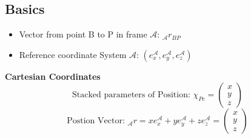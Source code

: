 \documentclass[fontsize=6pt,DIV=calc,a4paper,ngerman]{scrartcl}
\begin{document}
\begin{multicols*}{4}


	\section{Basics}
	\begin{itemize}
		\item[] Vector from point B to P in frame $\mathcal{A}$: \quad $ {}_\mathcal{A} r_{BP}$
		\item[] Reference coordinate System $\mathcal{A}$: \quad $(e^{\mathcal{A}}_x,e^{\mathcal{A}}_y,e^{\mathcal{A}}_z)$
	\end{itemize}
	\textbf{Cartesian Coordinates}
	$$\text{Stacked parameters of Position:  }\chi_{Pc}=\begin{pmatrix}x\\y\\z\end{pmatrix}$$
	$$\text{Postion Vector: } {}_\mathcal{A}r = xe^{\mathcal{A}}_x+ye^{\mathcal{A}}_y+ze^{\mathcal{A}}_z = \begin{pmatrix}x\\y\\z\end{pmatrix}$$


\end{multicols*}
\end{document}
